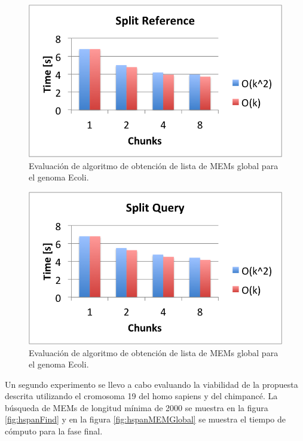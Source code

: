 \documentclass[12pt,a4paper]{article}
\begin{document}
   \begin{figure}[h] 
   \centering 
   \includegraphics[scale=0.7]{ex3.png} 
   \caption{Evaluación de algoritmo de obtención de lista de MEMs global para el genoma Ecoli.} 
   \label{fig:ecoliMEMR} 
 \end{figure}
   \begin{figure}[h] 
   \centering 
   \includegraphics[scale=0.7]{ex6.png} 
   \caption{Evaluación de algoritmo de obtención de lista de MEMs global para el genoma Ecoli.} 
   \label{fig:ecoliMEMQ} 
 \end{figure}
\indent
Un segundo experimento se llevo a cabo evaluando la viabilidad de la propuesta descrita utilizando el cromosoma 19 del homo sapiens y del chimpanc\'e. La búsqueda de MEMs de longitud mínima de 2000 se muestra en la figura \ref{fig:hspanFind} y en la figura \ref{fig:hspanMEMGlobal} se muestra el tiempo de cómputo para la fase final.\\
\end{document}
